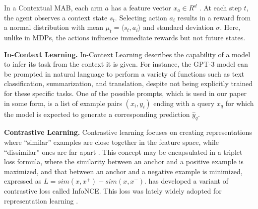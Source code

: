 In a Contextual MAB, each arm $a$ has a feature vector $x_a \in R^d$ \citep{sutton2018reinforcement}. At each step $t$, the agent observes a context state $s_t$. Selecting action $a_i$ results in a reward from a normal distribution with mean $\mu_t = \langle s_t, a_i \rangle$ and standard deviation $\sigma$. Here, unlike in MDPs, the actions influence immediate rewards but not future states.




\textbf{In-Context Learning.} In-Context Learning describes the capability of a model to infer its task from the context it is given. For instance, the GPT-3 model \citep{brown2020language} can be prompted in natural language to perform a variety of functions such as text classification, summarization, and translation, despite not being explicitly trained for these specific tasks. One of the possible prompts, which is used in our paper in some form, is a list of example pairs $(x_i, y_i)$ ending with a query $x_q$ for which the model is expected to generate a corresponding prediction $\hat{y}_q$.

\textbf{Contrastive Learning.} Contrastive learning focuses on creating representations where “similar” examples are close together in the feature space, while “dissimilar” ones are far apart \citep{weinberger2009distance, schroff2015facenet}. This concept may be encapsulated in a triplet loss formula, where the similarity between an anchor and a positive example is maximized, and that between an anchor and a negative example is minimized, expressed as $L = sim(x, x^+) - sim(x,x^-)$. \citet{oord2018representation} has developed a variant of contrastive loss called InfoNCE. This loss was lately widely adopted for representation learning \citep{jaiswal2020survey}.
